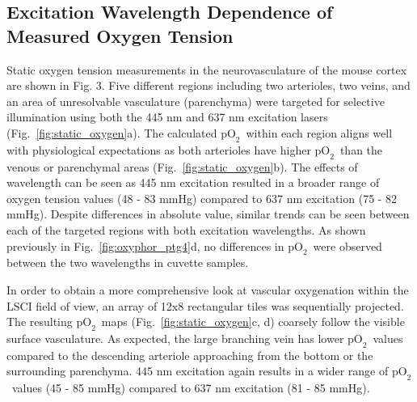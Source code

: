 \documentclass[12pt]{spieman}  %
\newcommand{\pO}{\ensuremath{\text{pO}_2}} 	            %
\begin{document}
\begin{spacing}{2}
\subsection{Excitation Wavelength Dependence of Measured Oxygen Tension}
Static oxygen tension measurements in the neurovasculature of the mouse cortex are shown in Fig. 3. Five different regions including two arterioles, two veins, and an area of unresolvable vasculature (parenchyma) were targeted for selective illumination using both the 445 nm and 637 nm excitation lasers (Fig.~\ref{fig:static_oxygen}a). The calculated \pO\ within each region aligns well with physiological expectations as both arterioles have higher \pO\ than the venous or parenchymal areas (Fig.~\ref{fig:static_oxygen}b). The effects of wavelength can be seen as 445 nm excitation resulted in a broader range of oxygen tension values (48 - 83 mmHg) compared to 637 nm excitation (75 - 82 mmHg). Despite differences in absolute value, similar trends can be seen between each of the targeted regions with both excitation wavelengths. As shown previously in Fig.~\ref{fig:oxyphor_ptg4}d, no differences in \pO\ were observed between the two wavelengths in cuvette samples.

In order to obtain a more comprehensive look at vascular oxygenation within the LSCI field of view, an array of 12x8 rectangular tiles was sequentially projected. The resulting \pO\ maps (Fig.~\ref{fig:static_oxygen}c, d) coarsely follow the visible surface vasculature. As expected, the large branching vein has lower \pO\ values compared to the descending arteriole approaching from the bottom or the surrounding parenchyma. 445 nm excitation again results in a wider range of \pO\ values (45 - 85 mmHg) compared to 637 nm excitation (81 - 85 mmHg).


\end{spacing}
\end{document}
